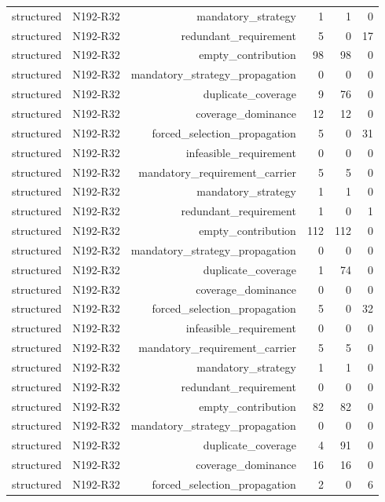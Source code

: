 {\begin{longtable}{lrrrrr}
structured & N192-R32 & mandatory\_strategy & 1 & 1 & 0 \\
structured & N192-R32 & redundant\_requirement & 5 & 0 & 17 \\
structured & N192-R32 & empty\_contribution & 98 & 98 & 0 \\
structured & N192-R32 & mandatory\_strategy\_propagation & 0 & 0 & 0 \\
structured & N192-R32 & duplicate\_coverage & 9 & 76 & 0 \\
structured & N192-R32 & coverage\_dominance & 12 & 12 & 0 \\
structured & N192-R32 & forced\_selection\_propagation & 5 & 0 & 31 \\
structured & N192-R32 & infeasible\_requirement & 0 & 0 & 0 \\
structured & N192-R32 & mandatory\_requirement\_carrier & 5 & 5 & 0 \\
structured & N192-R32 & mandatory\_strategy & 1 & 1 & 0 \\
structured & N192-R32 & redundant\_requirement & 1 & 0 & 1 \\
structured & N192-R32 & empty\_contribution & 112 & 112 & 0 \\
structured & N192-R32 & mandatory\_strategy\_propagation & 0 & 0 & 0 \\
structured & N192-R32 & duplicate\_coverage & 1 & 74 & 0 \\
structured & N192-R32 & coverage\_dominance & 0 & 0 & 0 \\
structured & N192-R32 & forced\_selection\_propagation & 5 & 0 & 32 \\
structured & N192-R32 & infeasible\_requirement & 0 & 0 & 0 \\
structured & N192-R32 & mandatory\_requirement\_carrier & 5 & 5 & 0 \\
structured & N192-R32 & mandatory\_strategy & 1 & 1 & 0 \\
structured & N192-R32 & redundant\_requirement & 0 & 0 & 0 \\
structured & N192-R32 & empty\_contribution & 82 & 82 & 0 \\
structured & N192-R32 & mandatory\_strategy\_propagation & 0 & 0 & 0 \\
structured & N192-R32 & duplicate\_coverage & 4 & 91 & 0 \\
structured & N192-R32 & coverage\_dominance & 16 & 16 & 0 \\
structured & N192-R32 & forced\_selection\_propagation & 2 & 0 & 6 \\

\end{longtable}}
